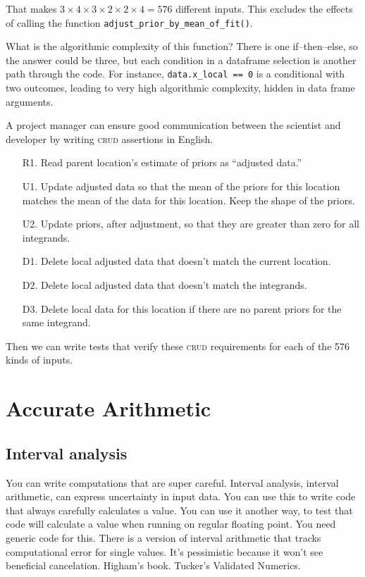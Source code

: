 \documentclass[fleqn,10pt]{olplainarticle}
\begin{document}
\noindent{}That makes $3\times 4 \times 3\times 2\times 2\times 4=576$ different inputs.
This excludes the effects of calling the function
\lstinline!adjust_prior_by_mean_of_fit()!.

What is the algorithmic complexity of this function? There is one
if--then--else, so the answer could be three, but each condition in a dataframe
selection is another path through the code. For instance,
\lstinline!data.x_local == 0! is a conditional with two outcomes, leading
to very high algorithmic complexity, hidden in data frame arguments.

A project manager can ensure good communication between the scientist and
developer by writing \textsc{crud} assertions in English.
\begin{itemize}
    \item[R1.] Read parent location's estimate of priors as ``adjusted data.''
    \item[U1.] Update adjusted data so that the mean of the priors for this location matches
        the mean of the data for this location. Keep the shape of the priors.
    \item[U2.] Update priors, after adjustment, so that they are greater
        than zero for all integrands.
    \item[D1.] Delete local adjusted data that doesn't match the current location.
    \item[D2.] Delete local adjusted data that doesn't match the integrands.
    \item[D3.] Delete local data for this location if there are no parent
        priors for the same integrand.
\end{itemize}
Then we can write tests that verify these \textsc{crud} requirements for
each of the 576 kinds of inputs.



\section{Accurate Arithmetic}\label{sec:accurate-arithmetic}

\subsection{Interval analysis}
You can write computations that are super careful. Interval analysis, interval arithmetic, can express uncertainty in input data. You can use this to write code that always carefully calculates a value. You can use it another way, to test that code will calculate a value when running on regular floating point. You need generic code for this. There is a version of interval arithmetic that tracks computational error for single values. It's pessimistic because it won't see beneficial cancelation. Higham's book. Tucker's Validated Numerics.
\end{document}
